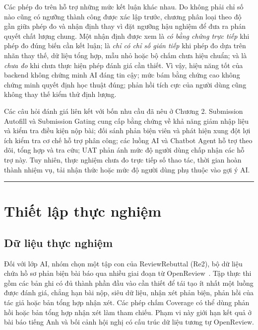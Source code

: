 Các phép đo trên hỗ trợ những mức kết luận khác nhau. Do không phải chỉ số nào cũng có ngưỡng thành công được xác lập trước, chương phân loại theo độ gần giữa phép đo và nhận định thay vì đặt ngưỡng hậu nghiệm để đưa ra phán quyết chất lượng chung. Một nhận định được xem là \textit{có bằng chứng trực tiếp} khi phép đo đúng biến cần kết luận; là \textit{chỉ có chỉ số gián tiếp} khi phép đo dựa trên nhãn thay thế, dữ liệu tổng hợp, mẫu nhỏ hoặc bộ chấm chưa hiệu chuẩn; và là \textit{chưa đo} khi chưa thực hiện phép đánh giá cần thiết. Vì vậy, hiệu năng tốt của backend không chứng minh AI đáng tin cậy; mức bám bằng chứng cao không chứng minh quyết định học thuật đúng; phản hồi tích cực của người dùng cũng không thay thế kiểm thử định lượng.

Các câu hỏi đánh giá liên kết với bốn nhu cầu đã nêu ở Chương 2. Submission Autofill và Submission Gating cung cấp bằng chứng về khả năng giảm nhập liệu và kiểm tra điều kiện nộp bài; đối sánh phản biện viên và phát hiện xung đột lợi ích kiểm tra cơ chế hỗ trợ phân công; các luồng AI và Chatbot Agent hỗ trợ theo dõi, tổng hợp và tra cứu; UAT phản ánh mức độ người dùng chấp nhận các hỗ trợ này. Tuy nhiên, thực nghiệm chưa đo trực tiếp số thao tác, thời gian hoàn thành nhiệm vụ, tải nhận thức hoặc mức độ người dùng phụ thuộc vào gợi ý AI.

\par\noindent\rule{\textwidth}{0.4pt}\par

\section{Thiết lập thực nghiệm}

\subsection{Dữ liệu thực nghiệm}

Đối với lớp AI, nhóm chọn một tập con của ReviewRebuttal (Re2), bộ dữ liệu chứa hồ sơ phản biện bài báo qua nhiều giai đoạn từ OpenReview~\cite{ch4ref1}. Tập thực thi gồm các bản ghi có đủ thành phần đầu vào cần thiết để tái tạo ít nhất một luồng được đánh giá, chẳng hạn bài nộp, siêu dữ liệu, nhận xét phản biện, phản hồi của tác giả hoặc bản tổng hợp nhận xét. Các phép chấm Coverage có thể dùng phản hồi hoặc bản tổng hợp nhận xét làm tham chiếu. Phạm vi này giới hạn kết quả ở bài báo tiếng Anh và bối cảnh hội nghị có cấu trúc dữ liệu tương tự OpenReview.


